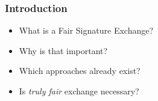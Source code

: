 \begin{frame}
	\frametitle{Introduction}
	\begin{itemize}
		\setlength\itemsep{1em}
		\item<1-> What is a Fair Signature Exchange?
		\item<1-> Why is that important?
		\item<1-> Which approaches already exist?
		\item<2-> Is \textit{truly fair} exchange necessary?
	\end{itemize}
\end{frame}